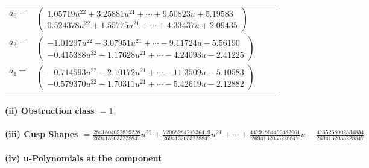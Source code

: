 \documentclass[1p]{elsarticle_modified}
\theoremstyle{definition}
\begin{document}
\begin{tabular}{m{7pt} m{180pt} m{7pt} m{180pt} }
\flushright $a_{6}=$&$\begin{pmatrix}1.05719 u^{22}+3.25881 u^{21}+\cdots+9.50823 u+5.19583\\0.524378 u^{22}+1.55775 u^{21}+\cdots+4.33437 u+2.09435\end{pmatrix}$ \\
\flushright $a_{2}=$&$\begin{pmatrix}-1.01297 u^{22}-3.07951 u^{21}+\cdots-9.11724 u-5.56190\\-0.415388 u^{22}-1.17628 u^{21}+\cdots-4.24093 u-2.41225\end{pmatrix}$ \\
\flushright $a_{1}=$&$\begin{pmatrix}-0.714593 u^{22}-2.10172 u^{21}+\cdots-11.3509 u-5.10583\\-0.579370 u^{22}-1.70311 u^{21}+\cdots-5.42619 u-2.12882\end{pmatrix}$\\&\end{tabular}
\flushleft \textbf{(ii) Obstruction class $= 1$}\\~\\
\flushleft \textbf{(iii) Cusp Shapes $= \frac{2841804052879228}{2694132033228847} u^{22}+\frac{7206898421736419}{2694132033228847} u^{21}+\cdots+\frac{44791864499482061}{2694132033228847} u-\frac{4765268002334834}{2694132033228847}$}\\~\\
\newpage\renewcommand{\arraystretch}{1}
\flushleft \textbf{(iv) u-Polynomials at the component}\newline \\
\end{document}
